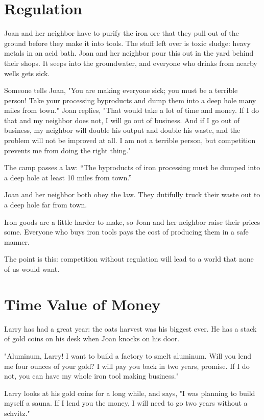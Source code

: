 \section{Regulation}

Joan and her neighbor have to purify the iron ore that they pull out of the ground before they make it into tools. The stuff left over is toxic sludge: heavy metals in an acid bath.  Joan and her neighbor pour this out in the yard behind their shops. It seeps into the groundwater, and everyone who drinks from nearby wells gets sick.

Someone tells Joan, "You are making everyone sick; you must be a terrible person! Take your processing byproducts and dump them into a deep hole many miles from town."  Joan replies, "That would take a lot of time and money.  If I do that and my neighbor does not, I will go out of business.  And if I go out of business, my neighbor will double his output and double his waste, and the problem will not be improved at all. I am not a terrible person, but competition prevents me from doing the right thing."

The camp passes a law: ``The byproducts of iron processing must be dumped
into a deep hole at least 10 miles from town.''

Joan and her neighbor both obey the law. They dutifully truck their waste
out to a deep hole far from town.

Iron goods are a little harder to make, so Joan and her neighbor raise their prices some. Everyone who buys iron tools pays the cost of producing them in a safe manner.

The point is this: competition without regulation will lead to a world that none of us would want.

\section{Time Value of Money}

Larry has had a great year: the oats harvest was his biggest ever.  He has a stack of gold coins on his desk when Joan knocks on his door.

"Aluminum, Larry! I want to build a factory to smelt aluminum. Will you lend me four ounces of your gold? I will pay you back in two years, promise. If I do not, you can have my whole iron tool making business."

Larry looks at his gold coins for a long while, and says, "I was planning to build myself a sauna. If I lend you the money, I will need to go two years without a schvitz."

